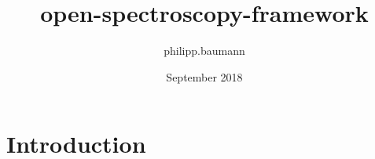 \documentclass{article}
\title{open-spectroscopy-framework}
\author{philipp.baumann }
\date{September 2018}
\begin{document}
\maketitle

\section{Introduction}
\end{document}

